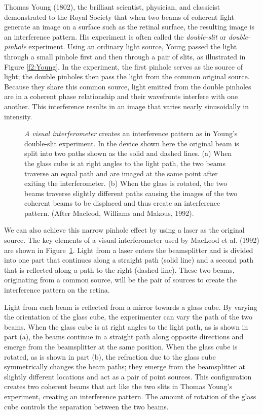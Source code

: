 Thomas Young (1802),
the brilliant scientist, physician, and classicist
demonstrated to the Royal Society that when
two beams of coherent light generate an image on
a surface such as the retinal surface,
the resulting image is an interference pattern.
His experiment is often called the {\em double-slit} or
{\em double-pinhole} experiment.
Using an ordinary
light source, Young passed the light through a small pinhole first
and then through a pair of slits, as illustrated
in Figure \ref{f2:Young}.
In the experiment,
the first pinhole serves as the source of light;
the double pinholes then pass the light from the
common original source.
Because they share this common source,
light emitted from the double pinholes are in
a coherent phase relationship
and their wavefronts interfere with one another.
This interference results in an image that varies nearly
sinusoidally in intensity.

\begin{figure}
\centerline {
}
\caption[Visual Interferometer]{
{\em A visual interferometer} creates an interference pattern
as in Young's double-slit experiment.
In the device shown here
the original beam is split into two paths shown as the solid
and dashed lines.
(a)  When the glass cube is at right angles to the light path,
the two beams traverse an equal path and are imaged at the
same point after exiting the interferometer.
(b)  When the glass is rotated, the two beams traverse slightly
different paths causing the images of the two coherent
beams to be displaced and thus create an interference pattern.
(After Macleod, Williams and Makous, 1992).
}
\label{f2:interferometer}
\end{figure}
We can also achieve this narrow pinhole effect
by using a laser as the original source.
The key elements of a visual interferometer used by
MacLeod et al. (1992) are shown in Figure~\ref{f2:interferometer}.
Light from a laser enters
the beamsplitter and is divided into
one part that continues along a straight path (solid line)
and a second path that is reflected along
a path to the right (dashed line).
These two beams, originating
from a common source, will be the pair of sources
to create the interference pattern on the retina.

Light from each beam is reflected from a mirror towards a glass cube.
By varying
the orientation of the glass cube,
the experimenter can vary the path of the two beams.
When the glass cube is at right angles to the light
path, as is shown in part (a),
the beams continue in a straight path along
opposite directions and
emerge from the beamsplitter at the same position.
When the glass cube is rotated, as is shown in part (b),
the refraction due
to the glass cube symmetrically changes the beam paths;
they emerge from the beamsplitter at slightly different locations
and act as a pair of point sources.
This configuration creates two coherent beams that act like
the two slits in Thomas Young's experiment, creating
an interference pattern.
The amount of rotation of the glass cube controls the
separation between the two beams.

